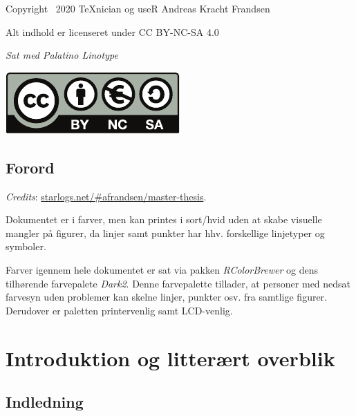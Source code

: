 \documentclass[
  a4paper,
  oneside]{memoir}
\begin{document}
\newpage

\vspace*{\fill}

Copyright \textcopyright\, 2020 \TeX nician og useR Andreas Kracht Frandsen

Alt indhold er licenseret under CC BY-NC-SA 4.0

\textit{Sat med Palatino Linotype}

\includegraphics[width=0.15\linewidth]{latex/bync}
\newpage


{
  \hypersetup{linkcolor=black}
  \tableofcontents
}

\newpage

{
  \hypersetup{linkcolor=black}
  \listoffigures

  \listoftables
}

\newpage

\hypertarget{forord}{%
\chapter*{Forord}\label{forord}}

\emph{Credits}: \href{http://starlogs.net/\#afrandsen/master-thesis}{starlogs.net/\#afrandsen/master-thesis}.

Dokumentet er i farver, men kan printes i sort/hvid uden at skabe visuelle mangler på figurer, da linjer samt punkter har hhv. forskellige linjetyper og symboler.

Farver igennem hele dokumentet er sat via pakken \emph{RColorBrewer} og dens tilhørende farvepalete \emph{Dark2}. Denne farvepalette tillader, at personer med nedsat farvesyn uden problemer kan skelne linjer, punkter osv. fra samtlige figurer. Derudover er paletten printervenlig samt LCD-venlig.
\newpage


\setcounter{secnumdepth}{3}

\part{Introduktion og litterært overblik}

\hypertarget{indledning}{%
\chapter{Indledning}\label{indledning}}
\end{document}
